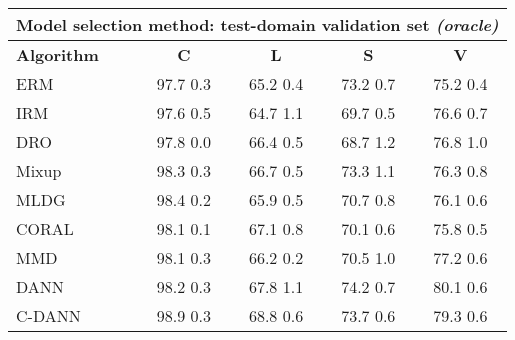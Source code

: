 \documentclass{article}
\begin{document}
\begin{center}
\begin{tabular}{lcccc}
\toprule
\multicolumn{5}{c}{\textbf{Model selection method: test-domain validation set \textit{(oracle)}}} \\
\midrule
\textbf{Algorithm}    & \textbf{C}                & \textbf{L}                & \textbf{S}                & \textbf{V}                \\
\midrule
ERM                       & 97.7  0.3            & 65.2  0.4            & 73.2  0.7            & 75.2  0.4            \\
IRM                       & 97.6  0.5            & 64.7  1.1            & 69.7  0.5            & 76.6  0.7            \\
DRO                 & 97.8  0.0            & 66.4  0.5            & 68.7  1.2            & 76.8  1.0            \\
Mixup                     & 98.3  0.3            & 66.7  0.5            & 73.3  1.1            & 76.3  0.8            \\
MLDG                      & 98.4  0.2            & 65.9  0.5            & 70.7  0.8            & 76.1  0.6            \\
CORAL                     & 98.1  0.1            & 67.1  0.8            & 70.1  0.6            & 75.8  0.5            \\
MMD                       & 98.1  0.3            & 66.2  0.2            & 70.5  1.0            & 77.2  0.6            \\
DANN                       & 98.2  0.3            & 67.8  1.1            & 74.2  0.7            & 80.1  0.6            \\
C-DANN                   & 98.9  0.3            & 68.8  0.6            & 73.7  0.6            & 79.3  0.6            \\
\bottomrule
\end{tabular}
\end{center}

\clearpage
\newpage
\end{document}
